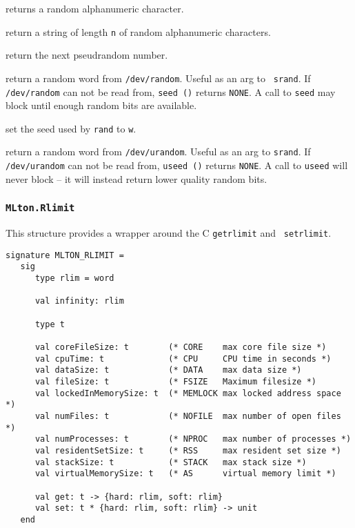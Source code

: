 \begin{description}
returns a random alphanumeric character.

return a string of length {\tt n} of random alphanumeric characters.

return the next pseudrandom number.

return a random word from {\tt /dev/random}.  Useful as an arg to {\tt
srand}.  If {\tt /dev/random} can not be read from, {\tt seed ()}
returns {\tt NONE}.  A call to {\tt seed} may block until enough
random bits are available.

set the seed used by {\tt rand} to {\tt w}.

return a random word from {\tt /dev/urandom}.  Useful as an arg to
{\tt srand}.  If {\tt /dev/urandom} can not be read from, {\tt useed
()} returns {\tt NONE}.  A call to {\tt useed} will never block -- it
will instead return lower quality random bits.

\end{description}
%
\subsubsection{\tt MLton.Rlimit}

This structure provides a wrapper around the C {\tt getrlimit} and {\tt
setrlimit}.
\begin{verbatim}
signature MLTON_RLIMIT =
   sig
      type rlim = word
               
      val infinity: rlim

      type t
               
      val coreFileSize: t        (* CORE    max core file size *)
      val cpuTime: t             (* CPU     CPU time in seconds *)
      val dataSize: t            (* DATA    max data size *)
      val fileSize: t            (* FSIZE   Maximum filesize *)
      val lockedInMemorySize: t  (* MEMLOCK max locked address space *)
      val numFiles: t            (* NOFILE  max number of open files *)  
      val numProcesses: t        (* NPROC   max number of processes *)
      val residentSetSize: t     (* RSS     max resident set size *)
      val stackSize: t           (* STACK   max stack size *)
      val virtualMemorySize: t   (* AS      virtual memory limit *)
      
      val get: t -> {hard: rlim, soft: rlim}
      val set: t * {hard: rlim, soft: rlim} -> unit
   end
\end{verbatim}

